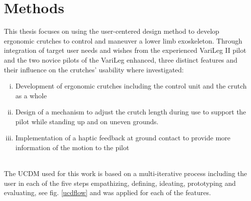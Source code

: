 \documentclass[conference,a4paper]{IEEEtran}
\begin{document}

\section{Methods}


This thesis focuses on using the user-centered design method to develop ergonomic crutches to control and maneuver a lower limb exoskeleton. Through integration of target user needs and wishes from the experienced VariLeg II pilot and the two novice pilots of the VariLeg enhanced, three distinct features and their influence on the crutches' usability where investigated:
\\
\begin{enumerate}[i.]
\label{threegoals}
	\item Development of ergonomic crutches including the control unit and the crutch as a whole
	\item Design of a mechanism to adjust the crutch length during use to support the pilot while standing up and on uneven grounds.
	\item Implementation of a haptic feedback at ground contact to provide more information of the motion to the pilot
\end{enumerate}
\\
The UCDM used for this work is based on a multi-iterative process including the user in each of the five steps empathizing, defining, ideating, prototyping and evaluating, see fig. \ref{ucdflow} and was applied for each of the features.
\end{document}
